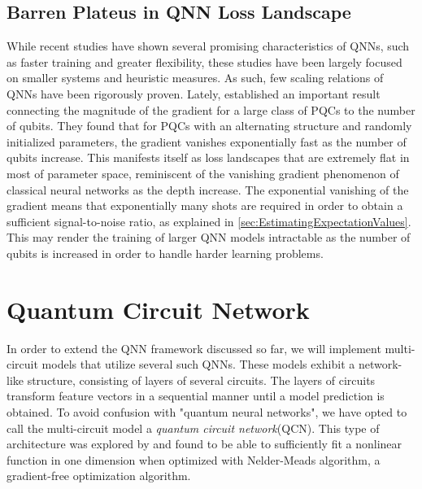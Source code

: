 \subsection{Barren Plateus in QNN Loss Landscape}\label{sec:BarrenPlateus}
While recent studies have shown several promising characteristics of QNNs, such as faster training and greater flexibility\cite{abbas2020power}, these studies have been largely focused on smaller systems and heuristic measures. As such, few scaling relations of QNNs have been rigorously proven. Lately, \cite{McClean_2018} established an important result connecting the magnitude of the gradient for a large class of PQCs to the number of qubits. They found that for PQCs with an alternating structure and randomly initialized parameters, the gradient vanishes exponentially fast as the number of qubits increase. This manifests itself as loss landscapes that are extremely flat in most of parameter space, reminiscent of the vanishing gradient phenomenon of classical neural networks as the depth increase\cite{shalevshwartz2017failures}. The exponential vanishing of the gradient means that exponentially many shots are required in order to obtain a sufficient signal-to-noise ratio, as explained in \autoref{sec:EstimatingExpectationValues}. This may render the training of larger QNN models intractable as the number of qubits is increased in order to handle harder learning problems.    


\section{Quantum Circuit Network}\label{sec:Quantum Circuit Network}
In order to extend the QNN framework discussed so far, we will implement multi-circuit models that utilize several such QNNs. These models exhibit a network-like structure, consisting of layers of several circuits. The layers of circuits transform feature vectors in a sequential manner until a model prediction is obtained. To avoid confusion with "quantum neural networks", we have opted to call the multi-circuit model a \emph{quantum circuit network}(QCN). This type of architecture was explored by \citet{b} and found to be able to sufficiently fit a nonlinear function in one dimension when optimized with Nelder-Meads algorithm, a gradient-free optimization algorithm.



